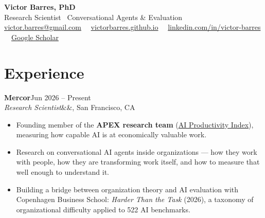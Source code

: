 \documentclass[10.5pt,a4paper]{article}
\newcommand{\name}[1]{{\Huge\bfseries\color{accent}#1}}
\newcommand{\role}[1]{{\large\color{muted}#1}}
\newcommand{\position}[5]{%
  \noindent
  \textbf{#1}\hfill\textcolor{muted}{#3}\\
  \textit{#4}\ifx&#5&\else, #5\fi\hfill\textcolor{muted}{#2}\par
  \vspace{2pt}
}
\begin{document}

\begin{minipage}{\textwidth}
\name{Victor Barres, PhD}\\[2pt]
\role{Research Scientist \textperiodcentered\ Conversational Agents \& Evaluation}\\[4pt]
\textcolor{muted}{%
  \href{mailto:victor.barres@gmail.com}{victor.barres@gmail.com}
  \ \textperiodcentered\
  \href{https://victorbarres.github.io}{victorbarres.github.io}
  \ \textperiodcentered\
  \href{https://www.linkedin.com/in/victor-barres/}{linkedin.com/in/victor-barres}
  \ \textperiodcentered\
  \href{https://scholar.google.com/citations?user=RpPIx5AAAAAJ}{Google Scholar}%
}
\end{minipage}

\section*{Experience}

\position{Mercor}{San Francisco, CA}{Jun 2026 – Present}
  {Research Scientist}{}
\begin{itemize}
  \item Founding member of the \textbf{APEX research team} (\href{https://www.mercor.com/blog/why-mercor-is-building-a-research-team/}{AI Productivity Index}), measuring how capable AI is at economically valuable work.
  \item Research on conversational AI agents inside organizations --- how they work with people, how they are transforming work itself, and how to measure that well enough to understand it.
  \item Building a bridge between organization theory and AI evaluation with Copenhagen Business School: \emph{Harder Than the Task} (2026), a taxonomy of organizational difficulty applied to 522 AI benchmarks.
\end{itemize}
\end{document}
